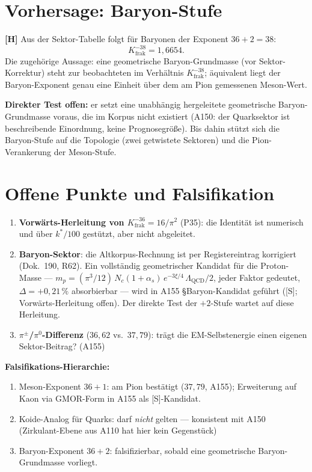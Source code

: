 \section{Vorhersage: Baryon-Stufe}

\textbf{[H]} Aus der Sektor-Tabelle folgt für Baryonen der Exponent
$36+2 = 38$:
\[
  K_\text{frak}^{-38} = 1{,}6654.
\]
Die zugehörige Aussage: eine geometrische Baryon-Grundmasse (vor
Sektor-Korrektur) steht zur beobachteten im Verhältnis
$K_\text{frak}^{-38}$; äquivalent liegt der Baryon-Exponent genau
eine Einheit über dem am Pion gemessenen Meson-Wert.

\textbf{Direkter Test offen:} er setzt eine unabhängig hergeleitete
geometrische Baryon-Grundmasse voraus, die im Korpus nicht existiert
(A150: der Quarksektor ist beschreibende Einordnung, keine
Prognosegröße). Bis dahin stützt sich die Baryon-Stufe auf die
Topologie (zwei getwistete Sektoren) und die Pion-Verankerung der
Meson-Stufe.

\section{Offene Punkte und Falsifikation}

\begin{enumerate}
\item \textbf{Vorwärts-Herleitung von $K_\text{frak}^{-36} = 16/\pi^2$}
  (P35): die Identität ist numerisch und über $k^*/100$ gestützt,
  aber nicht abgeleitet.
\item \textbf{Baryon-Sektor}: die Altkorpus-Rechnung ist per
  Registereintrag korrigiert (Dok.~190, R62). Ein vollständig
  geometrischer Kandidat für die Proton-Masse ---
  $m_p = (\pi^3/12)\,N_c(1+\alpha_s)\,e^{-3\xi/4}\,\Lambda_\text{QCD}/2$,
  jeder Faktor gedeutet, $\Delta=+0{,}21\,\%$ absorbierbar --- wird in
  A155 \S{}Baryon-Kandidat geführt ([S]; Vorwärts-Herleitung offen).
  Der direkte Test der $+2$-Stufe wartet auf diese Herleitung.
\item \textbf{$\pi^\pm$/$\pi^0$-Differenz} ($36{,}62$ vs.\ $37{,}79$):
  trägt die EM-Selbstenergie einen eigenen Sektor-Beitrag? (A155)
\end{enumerate}

\textbf{Falsifikations-Hierarchie:}
\begin{enumerate}
\item Meson-Exponent $36+1$: am Pion bestätigt ($37{,}79$, A155);
  Erweiterung auf Kaon via GMOR-Form in A155 als [S]-Kandidat.
\item Koide-Analog für Quarks: darf \emph{nicht} gelten ---
  konsistent mit A150 (\glqq Zirkulant-Ebene aus A110 hat hier kein
  Gegenstück\grqq) \checkmark
\item Baryon-Exponent $36+2$: falsifizierbar, sobald eine geometrische
  Baryon-Grundmasse vorliegt.
\end{enumerate}


